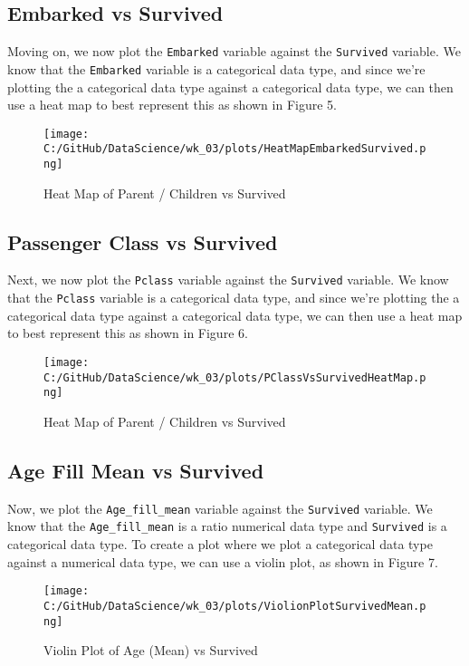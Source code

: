 \documentclass[a4paper, twocolumn]{article}
\begin{document}
\subsection{Embarked vs Survived}
Moving on, we now plot the \texttt{Embarked} variable against the \texttt{Survived} variable. We know that the 
\texttt{Embarked} variable is a categorical data type, and since we're plotting the a categorical data type against
a categorical data type, we can then use a heat map to best represent this as shown in Figure 5.
\begin{figure}[h!] 
    \centering
    \noindent
    \texttt{[image: C:/GitHub/DataScience/wk\_03/plots/HeatMapEmbarkedSurvived.png]}  
    \caption{Heat Map of Parent / Children vs Survived} 
\end{figure}

\subsection{Passenger Class vs Survived}
Next, we now plot the \texttt{Pclass} variable against the \texttt{Survived} variable. We know that the 
\texttt{Pclass} variable is a categorical data type, and since we're plotting the a categorical data type against
a categorical data type, we can then use a heat map to best represent this as shown in Figure 6.
\begin{figure}[h!] 
    \centering
    \noindent
    \texttt{[image: C:/GitHub/DataScience/wk\_03/plots/PClassVsSurvivedHeatMap.png]}  
    \caption{Heat Map of Parent / Children vs Survived} 
\end{figure}

\subsection{Age Fill Mean vs Survived}
Now, we plot the \texttt{Age\_fill\_mean} variable against the \texttt{Survived} variable. We know that the 
\texttt{Age\_fill\_mean} is a ratio numerical data type and \texttt{Survived} is a categorical data type.
To create a plot where we plot a categorical data type against a numerical data type, we can use a violin plot, as
shown in Figure 7.
\begin{figure}[h!] 
    \centering
    \noindent
    \texttt{[image: C:/GitHub/DataScience/wk\_03/plots/ViolionPlotSurvivedMean.png]}  
    \caption{Violin Plot of Age (Mean) vs Survived} 
\end{figure}
\end{document}
